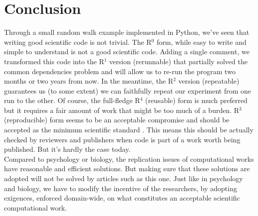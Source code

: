 \documentclass[a4paper,11pt]{article}
\begin{document}
\section*{Conclusion}

Through a small random walk example implemented in Python, we've seen that writing good scientific code is not trivial. The
R$^0$ form, while easy to write and simple to understand is not a good
scientific code. Adding a single comment, we transformed this code into the
R$^1$ version (rerunnable) that partially solved the common dependencies
problem and will allow us to re-run the program two months or two years from
now. In the meantime, the R$^2$ version (repeatable) guarantees us (to some
extent) we can faithfully repeat our experiment from one run to the other.  Of
course, the full-fledge R$^4$ (reusable) form is much preferred but it requires
a fair amount of work that might be too much of a burden. R$^3$ (reproducible)
form seems to be an acceptable compromise and should be accepted as the minimum
scientific standard \citep{Wilson:2017}. This means this should be actually
checked by reviewers and publishers when code is part of a work worth being
published. But it's hardly the case today.\\


Compared to psychology or biology, the replication issues of computational works have reasonable and efficient solutions. But making sure that these solutions are adopted will not be solved by articles such as this one. Just like in psychology and biology, we have to modify the incentive of the researchers, by adopting exigences, enforced domain-wide, on what constitutes an acceptable scientific computational work.


\renewcommand*{\bibfont}{\small}
\printbibliography[title=References]


\end{document}

